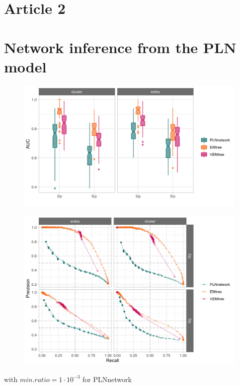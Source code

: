  \section{Article 2}
 \section{Network inference from the PLN model}

\begin{figure}
\centering
\includegraphics[width=12cm]{figs/AUC_PLN_EM_VEM.png}
\end{figure}
\begin{figure}
\centering
\includegraphics[width=12cm]{figs/precrec_PLN_EM_VEM.png}
\end{figure}

with $min.ratio=1\cdot 10^{-3}$ for PLNnetwork
